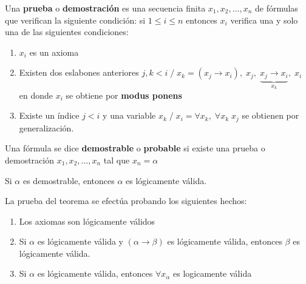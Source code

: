 \begin{definition}

Una \textbf{prueba} o \textbf{demostraci\'on} es una secuencia finita $x_1, x_2, \ldots, x_n$ de f\'ormulas que verifican la siguiente condici\'on: si $1 \leq i \leq n$ entonces $x_i$ verifica una y solo una de las siguientes condiciones:

\begin{enumerate}
	\item $x_i$ es un axioma
	\item Existen dos eslabones anteriores $j, k < i \; / \; x_k = (x_j \rightarrow x_i), \; x_j, \; \underbrace{x_j \rightarrow x_i}_{x_k}, \; x_i$ en donde $x_i$ se obtiene por \textbf{modus ponens}
	\item Existe un \'indice $j < i$ y una variable $x_k \; / \; x_i = \forall x_k, \; \forall x_k \; x_j$ se obtienen por generalizaci\'on.
\end{enumerate}

\end{definition}

\begin{definition}

Una f\'ormula se dice \textbf{demostrable} o \textbf{probable} si existe una prueba o demostraci\'on $x_1, x_2, \ldots, x_n$ tal que $x_n = \alpha$

\end{definition}

\begin{theorem}

Si $\alpha$ es demostrable, entonces $\alpha$ es l\'ogicamente v\'alida.

La prueba del teorema se efect\'ua probando los siguientes hechos:

\begin{enumerate}
	\item Los axiomas son l\'ogicamente v\'alidos
	\item Si $\alpha$ es l\'ogicamente v\'alida y $(\alpha \rightarrow \beta)$ es l\'ogicamente v\'alida, entonces $\beta$ es l\'ogicamente v\'alida.
	\item Si $\alpha$ es l\'ogicamente v\'alida, entonces $\forall x_{\alpha}$ es logicamente v\'alida
\end{enumerate}

\end{theorem}

